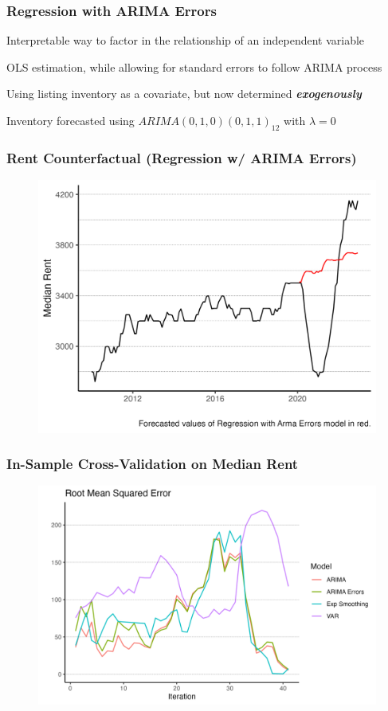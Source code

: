 \documentclass[t]{beamer}
\let\tempone\itemize
\let\temptwo\enditemize
\renewenvironment{itemize}{\tempone\addtolength{\itemsep}{0.5\baselineskip}}{\temptwo}
\begin{document}
\begin{frame}
\frametitle{Regression with ARIMA Errors}
\begin{itemize}
\item Interpretable way to factor in the relationship of an independent variable
\item OLS estimation, while allowing for standard errors to follow ARIMA process
\item Using listing inventory as a covariate, but now determined \textbf{\emph{exogenously}}
\item Inventory forecasted using $ARIMA(0,1,0)(0,1,1)_{12}$ with $\lambda=0$

\end{itemize}
\end{frame}

\begin{frame}
\frametitle{Rent Counterfactual (Regression w/ ARIMA Errors)}
\begin{figure}
\includegraphics[width= 4.2 in]{rent_counterfactual_arma_error.png}
\end{figure}
\end{frame}

\begin{frame}
\frametitle{In-Sample Cross-Validation on Median Rent}
\begin{figure}
\includegraphics[width=4.5in]{final_cv_results_graph.png}
\end{figure}
\end{frame}
\end{document}
